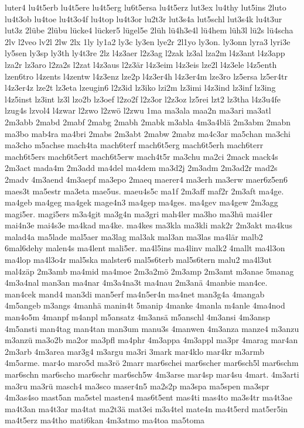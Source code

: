 {luter4
lu4t5erb
lu4t5ere
lu4t5erg
lu6t5ersa
lu4t5erz
lut3ex
lu4thy
lut5ins
2luto
lu4t3ob
lu4toe
lu4t3o4f
lu4top
lu4t3or
lu2t3r
lut3s4a
lut5schl
lut3s4k
lu4t3ur
lut3z
2lübe
2lübu
lücke4
lücker5
lügel5e
2lüh
lü4h3e4l
lü4hem
lüh3l
lü2s
lü4scha
2lv
l2veo
lv2l
2lw
2lx
1ly
ly1a2
ly3c
ly3en
lye2r
2l1yo
ly3on.
ly3onn
lyra3
lyri3e
ly5sen
ly3sp
ly3th
ly4t3re
2lz
l4z3aer
l2z3ag
l2zak
lz3al
lza2m
l4z3ant
l4z3app
lza2r
lz3aro
l2za2s
l2zat
l4z3aus
l2z3är
l4z3eim
l4z3eis
lze2l
l4z3ele
l4z5enth
lzen6tro
l4zents
l4zentw
l4z3enz
lze2p
l4z3er4h
l4z3er4m
lze3ro
lz5ersa
lz5er4tr
l4z3er4z
lze2t
lz3eta
lzeugin6
l2z3id
lz3iko
lzi2m
lz3imi
l4z3ind
lz3inf
lz3ing
l4z5inst
lz3int
lz3l
lzo2b
lz3oef
l2zo2f
l2z3or
l2z3oz
lz5rei
lzt2
lz3tha
l4z3u4fe
lzug4s
lzvol4
l4zwar
l2zwo
l2zwö
l2zwu
1ma
ma3ala
maa2n
ma3ari
ma3atl
2m3abb
2mabd
2mabf
2mabg
2mabh
2mabk
m3abla
4m3a4blä
2m3abm
2mabn
ma3bo
mab4ra
ma4bri
2mabs
2m3abt
2mabw
2mabz
ma4c3ar
ma5chan
ma3chi
ma3cho
m5achse
mach4ta
mach6terf
mach6t5erg
mach6t5erh
mach6terr
mach6t5ers
mach6t5ert
mach6t5erw
mach4t5r
ma3chu
ma2ci
2mack
mack4s
2m3act
mada4m
2m3add
ma4del
ma4dem
ma3d2j
2m3adm
2m3ad2r
mad2s
2madv
4m3aend
4m3aepf
ma3epo
2maeq
maerer4
ma3erh
ma3erw
maer6z5en6
maes3t
ma5estr
ma3eta
mae5us.
maeu4s5c
ma1f
2m3aff
maf2r
2m3aft
ma4ge.
ma4geb
ma4geg
ma4gek
mage4n3
ma4gep
ma4ges.
ma4gev
ma4gew
2m3agg
magi5er.
magi5ers
m3a4git
ma3g4n
ma3gri
mah4ler
ma3ho
ma3hü
mai4ler
mai4n3e
mai4s3e
ma4kad
ma4ke.
ma4kes
ma3kla
ma3kli
mak2r
2m3akt
ma4kus
malad4a
ma5lade
mal5aer
ma3lag
mal3ak
mal3an
ma3las
ma4lär
malb2
6mal6dehy
malen4s
ma4lent
mali5er.
ma4l5ins
ma4linv
malk2
4mallt
ma4l3on
ma4lop
ma4l3o4r
mal5ska
malster6
mal5s6terb
mal5s6tern
malu2
ma4l3ut
mal4zäp
2m3amb
ma4mid
ma4moe
2m3a2mö
2m3amp
2m3amt
m3anae
5manag
4m3a4nal
man3an
ma4nar
4m3a4na3t
ma4nau
2m3anä
4manbie
man4ce.
man4cek
mand4
man3di
man5erf
ma4n5er4n
ma4net
man3g4a
4mangab
4m5angeb
m3angs
4manhä
manin4t
5manip
4manke
4manla
m4anle
4ma4nod
man4o5m
4manpf
m4anpl
m5ansatz
4m3ansä
m5anschl
4m3ansi
4m3ansp
4m5ansti
man4tag
man4tan
man3um
manu3s
4manwen
4m3anza
manze4
m3anzu
m3anzü
ma3o2b
ma2or
ma3pfl
ma4phr
4m3appa
4m3appl
ma3pr
4marag
mar4an
2m3arb
4m3area
mar3g4
m3argu
ma3ri
3mark
mar4klo
mar4kr
m3armb
4m5arme.
mar4o
maro5d
ma3rö
2marr
mar6schei
mar6scher
mar6sch5l
mar6schm
mar6schn
mar6scho
mar6schr
mar6sch5w
4m3arse
mar4sp
mar4su
4mart.
4m3arti
ma3ru
ma3rü
masch4
ma3sco
maser4n5
ma2s2p
ma3spa
ma5spen
ma3spr
4m3as4so
mast5an
ma5stel
masten4
mas6t5ent
mas4ti
mas4to
ma3s4tr
ma4t3ae
ma4t3an
ma4t3ar
ma4tat
ma2t3ä
mat3ei
m3a4tel
mate4n
ma4t5erd
mat5er5in
ma4t5erz
ma4tho
mati6kan
4m3atmo
ma4toa
ma5toma
}
